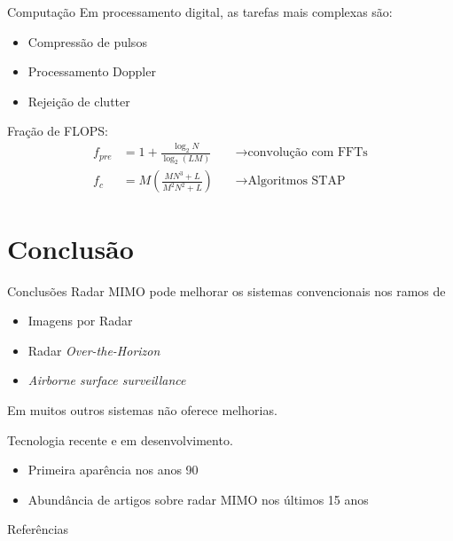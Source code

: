 \documentclass[portuguese]{beamer}
\begin{document}
\begin{frame}{Computação}
  Em processamento digital, as tarefas mais complexas são:
  \begin{itemize}
	\item Compressão de pulsos
	\item Processamento Doppler
	\item Rejeição de clutter
  \end{itemize}
  Fração de FLOPS:
  \begin{align*}
	f_{pre} &= 1+ \frac{\log_2 N}{\log_2 (LM)}\, &&\longrightarrow \textrm{convolução com FFTs}
 \\
	f_c &= M\left( \frac{MN^3+L}{M^2N^2+L} \right) \, &&\longrightarrow \textrm{Algoritmos STAP}
  \end{align*}
\end{frame}

\section{Conclusão}

\begin{frame}{Conclusões}
  Radar MIMO pode melhorar os sistemas convencionais nos ramos de
  \begin{itemize}
	\item Imagens por Radar
	\item Radar \textit{Over-the-Horizon} 
	\item \textit{Airborne surface surveillance}
  \end{itemize}
  Em muitos outros sistemas não oferece melhorias.

  \vspace{20pt}

  Tecnologia recente e em desenvolvimento.
  \begin{itemize}
	\item Primeira aparência nos anos 90
	\item Abundância de artigos sobre radar MIMO nos últimos 15 anos
  \end{itemize}

\end{frame}

\begin{frame}{Referências}
  \printbibliography
\end{frame}
\end{document}
